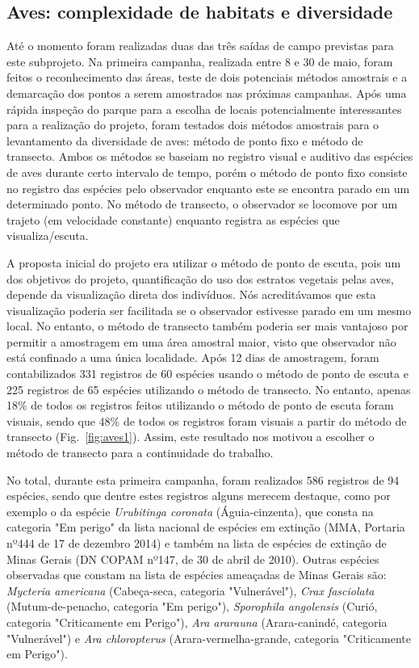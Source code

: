 \subsection{Aves: complexidade de habitats e diversidade} %
\label{sec:compl-de-habit} 

Até o momento foram realizadas duas das três saídas de campo previstas
para este subprojeto. Na primeira campanha, realizada entre 8 e 30 de
maio, foram feitos o reconhecimento das áreas, teste de dois
potenciais métodos amostrais e a demarcação dos pontos a serem
amostrados nas próximas campanhas. Após uma rápida inspeção do parque
para a escolha de locais potencialmente interessantes para a
realização do projeto, foram testados dois métodos amostrais para o
levantamento da diversidade de aves: método de ponto fixo e método de
transecto. Ambos os métodos se baseiam no registro visual e auditivo
das espécies de aves durante certo intervalo de tempo, porém o método
de ponto fixo consiste no registro das espécies pelo observador
enquanto este se encontra parado em um determinado ponto. No método de
transecto, o observador se locomove por um trajeto (em velocidade
constante) enquanto registra as espécies que visualiza/escuta.

A proposta inicial do projeto era utilizar o método de ponto de
escuta, pois um dos objetivos do projeto, quantificação do uso dos
estratos vegetais pelas aves, depende da visualização direta dos
indivíduos. Nós acreditávamos que esta visualização poderia ser
facilitada se o observador estivesse parado em um mesmo local. No
entanto, o método de transecto também poderia ser mais vantajoso por
permitir a amostragem em uma área amostral maior, visto que observador
não está confinado a uma única localidade. Após 12 dias de amostragem,
foram contabilizados 331 registros de 60 espécies usando o método de
ponto de escuta e 225 registros de 65 espécies utilizando o método de
transecto. No entanto, apenas 18\% de todos os registros feitos
utilizando o método de ponto de escuta foram visuais, sendo que 48\%
de todos os registros foram visuais a partir do método de transecto
(Fig.~\ref{fig:aves1}).  Assim, este resultado nos motivou a escolher o método de
transecto para a continuidade do trabalho.

No total, durante esta primeira campanha, foram realizados 586
registros de 94 espécies, sendo que dentre estes registros alguns
merecem destaque, como por exemplo o da espécie \textit{Urubitinga
coronata} (Águia-cinzenta), que consta na categoria "Em perigo" da
lista nacional de espécies em extinção (MMA, Portaria nº444 de 17 de
dezembro 2014) e também na lista de espécies de extinção de Minas
Gerais (DN COPAM nº147, de 30 de abril de 2010). Outras espécies
observadas que constam na lista de espécies ameaçadas de Minas Gerais
são: \textit{Mycteria americana} (Cabeça-seca, categoria
"Vulnerável"), \textit{Crax fasciolata} (Mutum-de-penacho, categoria
"Em perigo"), \textit{Sporophila angolensis} (Curió, categoria
"Criticamente em Perigo"), \textit{Ara ararauna} (Arara-canindé,
categoria "Vulnerável") e \textit{Ara chloropterus}
(Arara-vermelha-grande, categoria "Criticamente em Perigo").

